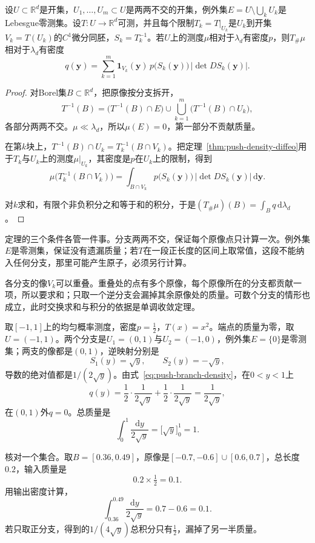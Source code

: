 \begin{theorem}[分支映射的推前密度]
\label{thm:push-branch-density}
设$U\subset\mathbb R^d$是开集，$U_1,\ldots,U_m\subset U$是两两不交的开集，例外集$E=U\setminus\bigcup_kU_k$是Lebesgue零测集。设$T:U\to\mathbb R^d$可测，并且每个限制$T_k=T|_{U_k}$是$U_k$到开集$V_k=T(U_k)$的$C^1$微分同胚，$S_k=T_k^{-1}$。若$U$上的测度$\mu$相对于$\lambda_d$有密度$p$，则$T_\#\mu$相对于$\lambda_d$有密度
\begin{equation}
q(\bm y)=\sum_{k=1}^m\mathbf 1_{V_k}(\bm y)\,p\bigl(S_k(\bm y)\bigr)\,\bigl\lvert\det DS_k(\bm y)\bigr\rvert .
\label{eq:push-branch-density}
\end{equation}
\end{theorem}

\begin{proof}
对Borel集$B\subset\mathbb R^d$，把原像按分支拆开，
\[
T^{-1}(B)=\bigl(T^{-1}(B)\cap E\bigr)\cup\bigcup_{k=1}^m\bigl(T^{-1}(B)\cap U_k\bigr),
\]
各部分两两不交。$\mu\ll\lambda_d$，所以$\mu(E)=0$，第一部分不贡献质量。

在第$k$块上，$T^{-1}(B)\cap U_k=T_k^{-1}(B\cap V_k)$。把定理~\ref{thm:push-density-diffeo}用于$T_k$与$U_k$上的测度$\mu|_{U_k}$，其密度是$p$在$U_k$上的限制，得到
\[
\mu\bigl(T_k^{-1}(B\cap V_k)\bigr)=\int_{B\cap V_k}p\bigl(S_k(\bm y)\bigr)\,\lvert\det DS_k(\bm y)\rvert\,\mathrm d\bm y .
\]

对$k$求和，有限个非负积分之和等于和的积分，于是$(T_\#\mu)(B)=\int_Bq\,\mathrm d\lambda_d$。
\end{proof}

定理的三个条件各管一件事。分支两两不交，保证每个原像点只计算一次。例外集$E$是零测集，保证没有遗漏质量；若$T$在一段正长度的区间上取常值，这段不能纳入任何分支，那里可能产生原子，必须另行计算。

各分支的像$V_k$可以重叠。重叠处的点有多个原像，每个原像所在的分支都贡献一项，所以要求和；只取一个逆分支会漏掉其余原像处的质量。可数个分支的情形也成立，此时交换求和与积分的依据是单调收敛定理。

\begin{example}[平方映射]
\label{ex:push-square}
取$[-1,1]$上的均匀概率测度，密度$p=\tfrac12$，$T(x)=x^2$。端点的质量为零，取$U=(-1,1)$。两个分支是$U_1=(0,1)$与$U_2=(-1,0)$，例外集$E=\{0\}$是零测集；两支的像都是$(0,1)$，逆映射分别是
\[
S_1(y)=\sqrt y,\qquad S_2(y)=-\sqrt y ,
\]
导数的绝对值都是$1/(2\sqrt y)$。由式~\eqref{eq:push-branch-density}，在$0<y<1$上
\[
q(y)=\frac12\cdot\frac{1}{2\sqrt y}+\frac12\cdot\frac{1}{2\sqrt y}=\frac{1}{2\sqrt y},
\]
在$(0,1)$外$q=0$。总质量是
\[
\int_0^1\frac{\mathrm dy}{2\sqrt y}=\bigl[\sqrt y\bigr]_0^1=1 .
\]

核对一个集合。取$B=[0.36,0.49]$，原像是$[-0.7,-0.6]\cup[0.6,0.7]$，总长度$0.2$，输入质量是
\[
0.2\times\tfrac12=0.1 .
\]
用输出密度计算，
\[
\int_{0.36}^{0.49}\frac{\mathrm dy}{2\sqrt y}=0.7-0.6=0.1 .
\]
若只取正分支，得到的$1/(4\sqrt y)$总积分只有$\tfrac12$，漏掉了另一半质量。
\end{example}

